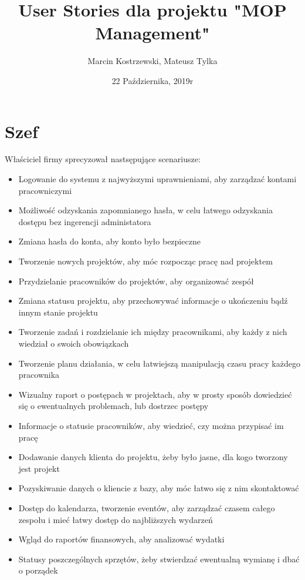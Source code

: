\documentclass{article}
\title{User Stories dla projektu "MOP Management"}
\author{Marcin Kostrzewski, Mateusz Tylka}
\date{22 Października, 2019r}
\begin{document}
\maketitle
\newpage
\tableofcontents
\newpage

\section{Szef}
Właściciel firmy sprecyzował nastsępujące scenariusze:
\begin{itemize}
    \item Logowanie do systemu z najwyższymi uprawnieniami, aby zarządzać kontami pracowniczymi
    \item Możliwość odzyskania zapomnianego hasła, w celu łatwego odzyskania dostępu bez ingerencji administatora
    \item Zmiana hasła do konta, aby konto było bezpieczne
    \item Tworzenie nowych projektów, aby móc rozpocząc pracę nad projektem
    \item Przydzielanie pracowników do projektów, aby organizować zespół
    \item Zmiana statusu projektu, aby przechowywać informacje o ukończeniu bądź innym stanie projektu
    \item Tworzenie zadań i rozdzielanie ich między pracownikami, aby każdy z nich wiedział o swoich obowiązkach
    \item Tworzenie planu działania, w celu łatwiejszą manipulacją czasu pracy każdego pracownika
    \item Wizualny raport o postępach w projektach, aby w prosty sposób dowiedzieć się o ewentualnych problemach, lub dostrzec postępy
    \item Informacje o statusie pracowników, aby wiedzieć, czy można przypisać im pracę
    \item Dodawanie danych klienta do projektu, żeby było jasne, dla kogo tworzony jest projekt
    \item Pozyskiwanie danych o kliencie z bazy, aby móc łatwo się z nim skontaktować
    \item Dostęp do kalendarza, tworzenie eventów, aby zarządzać czasem całego zespołu i mieć łatwy dostęp do najbliższych wydarzeń
    \item Wgląd do raportów finansowych, aby analizować wydatki
    \item Statusy poszczególnych sprzętów, żeby stwierdzać ewentualną wymianę i dbać o porządek
\end{itemize}
\end{document}
